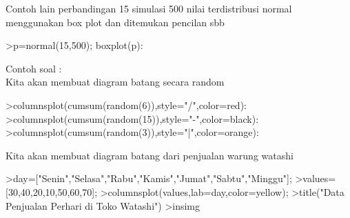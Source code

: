 \documentclass[a4paper,10pt]{article}
\begin{document}
\begin{eulernotebook}
\begin{eulercomment}
\begin{eulercomment}
\begin{eulercomment}
\begin{eulercomment}
\begin{eulercomment}
\begin{eulercomment}
\begin{eulercomment}
\begin{eulercomment}
\begin{eulercomment}
\begin{eulercomment}
\begin{eulercomment}
\begin{eulercomment}
\begin{eulercomment}
\begin{eulercomment}
\begin{eulercomment}
\begin{eulercomment}
\begin{eulercomment}
\begin{eulercomment}
\begin{eulercomment}
\begin{eulercomment}
\begin{eulercomment}
\begin{eulercomment}
\begin{eulercomment}
\begin{eulercomment}
\begin{eulercomment}
\begin{eulercomment}
\begin{eulercomment}
\begin{eulercomment}
\begin{eulercomment}
\begin{eulercomment}
\begin{eulercomment}
\begin{eulercomment}
\begin{eulercomment}
\begin{eulercomment}
\begin{eulercomment}
\begin{eulercomment}
\begin{eulercomment}
\begin{eulercomment}
\begin{eulercomment}
\begin{eulercomment}
\begin{eulercomment}
\begin{eulercomment}
\begin{eulercomment}
\begin{eulercomment}
\begin{eulercomment}
\begin{eulercomment}
\begin{eulercomment}
\begin{eulercomment}
\begin{eulercomment}
\begin{eulercomment}
\begin{eulercomment}
Contoh lain perbandingan 15 simulasi 500 nilai terdistribusi normal
menggunakan box plot dan ditemukan pencilan sbb
\end{eulercomment}
\begin{eulerprompt}
>p=normal(15,500); boxplot(p):
\end{eulerprompt}
\begin{eulercomment}
Contoh soal : \\
Kita akan membuat diagram batang secara random 
\end{eulercomment}
\begin{eulerprompt}
>columnsplot(cumsum(random(6)),style="/",color=red):
>columnsplot(cumsum(random(15)),style="-",color=black):
>columnsplot(cumsum(random(3)),style="|",color=orange):
\end{eulerprompt}
\begin{eulercomment}
Kita akan membuat diagram batang dari penjualan warung watashi 
\end{eulercomment}
\begin{eulerprompt}
>day=["Senin","Selasa","Rabu","Kamis","Jumat","Sabtu","Minggu"];
>values=[30,40,20,10,50,60,70];
>columnsplot(values,lab=day,color=yellow);
>title("Data Penjualan Perhari di Toko Watashi")
>insimg

\end{eulerprompt}
\end{eulercomment}
\end{eulercomment}
\end{eulercomment}
\end{eulercomment}
\end{eulercomment}
\end{eulercomment}
\end{eulercomment}
\end{eulercomment}
\end{eulercomment}
\end{eulercomment}
\end{eulercomment}
\end{eulercomment}
\end{eulercomment}
\end{eulercomment}
\end{eulercomment}
\end{eulercomment}
\end{eulercomment}
\end{eulercomment}
\end{eulercomment}
\end{eulercomment}
\end{eulercomment}
\end{eulercomment}
\end{eulercomment}
\end{eulercomment}
\end{eulercomment}
\end{eulercomment}
\end{eulercomment}
\end{eulercomment}
\end{eulercomment}
\end{eulercomment}
\end{eulercomment}
\end{eulercomment}
\end{eulercomment}
\end{eulercomment}
\end{eulercomment}
\end{eulercomment}
\end{eulercomment}
\end{eulercomment}
\end{eulercomment}
\end{eulercomment}
\end{eulercomment}
\end{eulercomment}
\end{eulercomment}
\end{eulercomment}
\end{eulercomment}
\end{eulercomment}
\end{eulercomment}
\end{eulercomment}
\end{eulercomment}
\end{eulercomment}
\end{eulernotebook}
\end{document}
